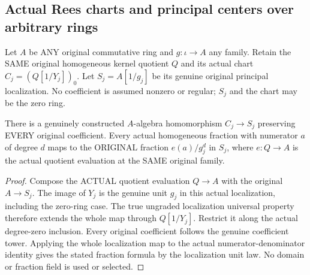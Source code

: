 \subsection{Actual Rees charts and principal centers over arbitrary rings}

Let $A$ be ANY original commutative ring and $g:\iota\to A$ any family.
Retain the SAME original homogeneous kernel quotient $Q$ and its actual
chart $C_j=(Q[1/Y_j])_0$. Let $S_j=A[1/g_j]$ be its genuine original
principal localization. No coefficient is assumed nonzero or regular;
$S_j$ and the chart may be the zero ring.

\begin{theorem}
\label{algebra:actual-rees-chart-away-map}
\leanok
There is a genuinely constructed $A$-algebra homomorphism
$C_j\to S_j$ preserving EVERY original coefficient. Every actual
homogeneous fraction with numerator $a$ of degree $d$ maps to the
ORIGINAL fraction $e(a)/g_j^d$ in $S_j$, where $e:Q\to A$ is the
actual quotient evaluation at the SAME original family.
\end{theorem}
\begin{proof}
Compose the ACTUAL quotient evaluation $Q\to A$ with the original
$A\to S_j$. The image of $Y_j$ is the genuine unit $g_j$ in this
actual localization, including the zero-ring case. The true ungraded
localization universal property therefore extends the whole map through
$Q[1/Y_j]$. Restrict it along the actual degree-zero inclusion.
Every original coefficient follows the genuine coefficient tower.
Applying the whole localization map to the actual numerator-denominator
identity gives the stated fraction formula by the localization unit law.
No domain or fraction field is used or selected.
\end{proof}

